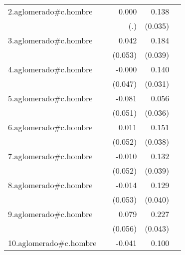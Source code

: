 {\begin{longtable}{l*{4}{D{.}{.}{-1}}}
\addlinespace
2.aglomerado#c.hombre&                     &       0.000         &       0.138\sym{***}&                     \\
            &                     &         (.)         &     (0.035)         &                     \\
\addlinespace
3.aglomerado#c.hombre&                     &       0.042         &       0.184\sym{***}&                     \\
            &                     &     (0.053)         &     (0.039)         &                     \\
\addlinespace
4.aglomerado#c.hombre&                     &      -0.000         &       0.140\sym{***}&                     \\
            &                     &     (0.047)         &     (0.031)         &                     \\
\addlinespace
5.aglomerado#c.hombre&                     &      -0.081         &       0.056         &                     \\
            &                     &     (0.051)         &     (0.036)         &                     \\
\addlinespace
6.aglomerado#c.hombre&                     &       0.011         &       0.151\sym{***}&                     \\
            &                     &     (0.052)         &     (0.038)         &                     \\
\addlinespace
7.aglomerado#c.hombre&                     &      -0.010         &       0.132\sym{***}&                     \\
            &                     &     (0.052)         &     (0.039)         &                     \\
\addlinespace
8.aglomerado#c.hombre&                     &      -0.014         &       0.129\sym{**} &                     \\
            &                     &     (0.053)         &     (0.040)         &                     \\
\addlinespace
9.aglomerado#c.hombre&                     &       0.079         &       0.227\sym{***}&                     \\
            &                     &     (0.056)         &     (0.043)         &                     \\
\addlinespace
10.aglomerado#c.hombre&                     &      -0.041         &       0.100\sym{**} &                     \\

\end{longtable}}

